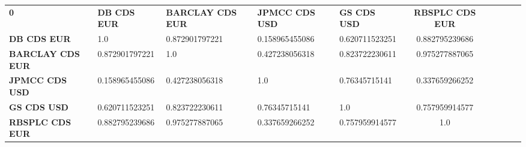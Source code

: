 \begin{tabular}{|l|l|l|l|l|c|c|c|c|c|}
\hline
\textbf{0} & \textbf{DB CDS EUR} & \textbf{BARCLAY CDS EUR} & \textbf{JPMCC CDS USD} & \textbf{GS CDS USD} & \textbf{RBSPLC CDS EUR}\\\hhline{|=|=|=|=|=|=|}
\textbf{DB CDS EUR} & 1.0 & 0.872901797221 & 0.158965455086 & 0.620711523251 & 0.882795239686\\
\textbf{BARCLAY CDS EUR} & 0.872901797221 & 1.0 & 0.427238056318 & 0.823722230611 & 0.975277887065\\
\textbf{JPMCC CDS USD} & 0.158965455086 & 0.427238056318 & 1.0 & 0.76345715141 & 0.337659266252\\
\textbf{GS CDS USD} & 0.620711523251 & 0.823722230611 & 0.76345715141 & 1.0 & 0.757959914577\\
\textbf{RBSPLC CDS EUR} & 0.882795239686 & 0.975277887065 & 0.337659266252 & 0.757959914577 & 1.0\\
\hline
\end{tabular}
